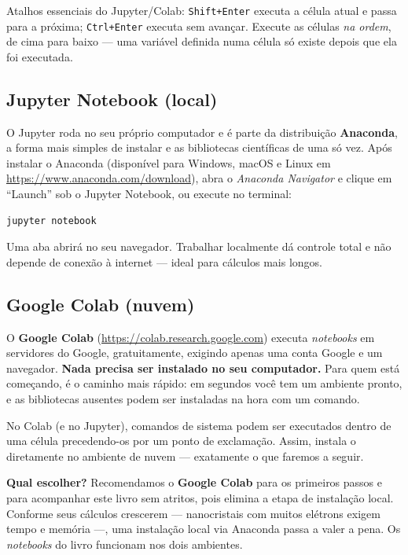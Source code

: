 \begin{caixadica}
Atalhos essenciais do Jupyter/Colab: \texttt{Shift+Enter} executa a célula atual
e passa para a próxima; \texttt{Ctrl+Enter} executa sem avançar. Execute as
células \emph{na ordem}, de cima para baixo --- uma variável definida numa célula
só existe depois que ela foi executada.
\end{caixadica}

\subsection{Jupyter Notebook (local)}

O Jupyter roda no seu próprio computador e é parte da distribuição
\textbf{Anaconda}, a forma mais simples de instalar \python{} e as bibliotecas
científicas de uma só vez. Após instalar o Anaconda (disponível para Windows,
macOS e Linux em \url{https://www.anaconda.com/download}), abra o
\emph{Anaconda Navigator} e clique em ``Launch'' sob o Jupyter Notebook, ou
execute no terminal:

\begin{lstlisting}[style=console]
jupyter notebook
\end{lstlisting}

\noindent
Uma aba abrirá no seu navegador. Trabalhar localmente dá controle total e não
depende de conexão à internet --- ideal para cálculos mais longos.

\subsection{Google Colab (nuvem)}

O \textbf{Google Colab} (\url{https://colab.research.google.com}) executa
\emph{notebooks} \python{} em servidores do Google, gratuitamente, exigindo apenas
uma conta Google e um navegador. \textbf{Nada precisa ser instalado no seu
computador.} Para quem está começando, é o caminho mais rápido: em segundos você
tem um ambiente pronto, e as bibliotecas ausentes podem ser instaladas na hora
com um comando.

\begin{caixadica}
No Colab (e no Jupyter), comandos de sistema podem ser executados dentro de uma
célula precedendo-os por um ponto de exclamação. Assim, 
instala o \pyscf{} diretamente no ambiente de nuvem --- exatamente o que faremos a
seguir.
\end{caixadica}

\begin{caixanota}
\textbf{Qual escolher?} Recomendamos o \textbf{Google Colab} para os primeiros
passos e para acompanhar este livro sem atritos, pois elimina a etapa de
instalação local. Conforme seus cálculos crescerem --- nanocristais com muitos
elétrons exigem tempo e memória ---, uma instalação local via Anaconda passa a
valer a pena. Os \emph{notebooks} do livro funcionam nos dois ambientes.
\end{caixanota}

